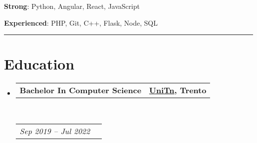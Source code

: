 \documentclass[10pt,a4paper,hidelinks]{article}
\makeatletter
\newenvironment{indentsection}[1]%
{\begin{list}{}%
	{\setlength{\leftmargin}{#1}}%
	\item[]%
}
{\end{list}}
\newcommand{\headerrow}[2]
{\begin{tabular*}{\linewidth}{l@{\extracolsep{\fill}}r}
	#1 &
	#2 \\
\end{tabular*}}
\makeatother
\begin{document}
\begin{indentsection}{\parindent}
\begin{flushleft}
    \textbf{Strong}: Python, Angular, React, JavaScript 
\end{flushleft}
\vspace{-1.0em}
\begin{flushleft}
    \textbf{Experienced}: PHP, Git, C++, Flask, Node, SQL
\end{flushleft}
\end{indentsection}



{\color{IFMediumGreen} \hrule}
\vspace{-0.3em}
{\color{IFDarkGreen}\section*{Education}}

\begin{itemize}
	\parskip=0.1em

	\item 
	\headerrow
		{\textbf{Bachelor In Computer Science}}
		{\textbf{\colorbox{IFLightGreen!30}{\href{https://www.unitn.it/}{\textbf{UniTn}}}{, Trento}}}
	\\
	\headerrow
		{\emph{Sep 2019 -- Jul 2022}}
		{\emph{}}

\end{itemize}



%
%
%	
%
\end{document}

